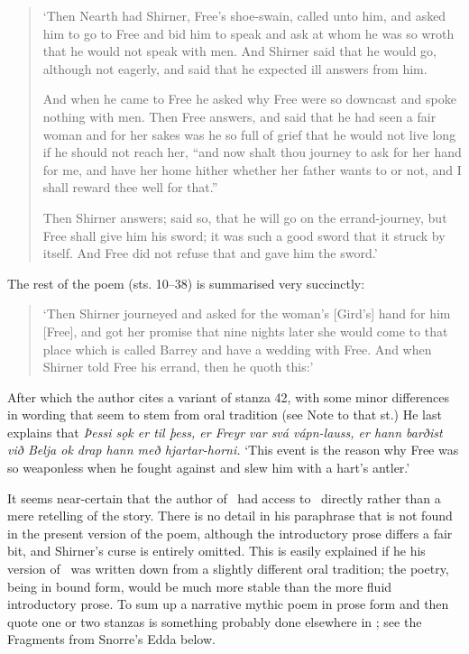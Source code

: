 \begin{quote}{\small ‘Then Nearth had Shirner, Free’s shoe-swain, called unto him, and asked him to go to Free and bid him to speak and ask at whom he was so wroth that he would not speak with men.  And Shirner said that he would go, although not eagerly, and said that he expected ill answers from him.

And when he came to Free he asked why Free were so downcast and spoke nothing with men.  Then Free answers, and said that he had seen a fair woman and for her sakes was he so full of grief that he would not live long if he should not reach her, “and now shalt thou journey to ask for her hand for me, and have her home hither whether her father wants to or not, and I shall reward thee well for that.”

Then Shirner answers; said so, that he will go on the errand-journey, but Free shall give him his sword; it was such a good sword that it struck by itself.  And Free did not refuse that and gave him the sword.’}\end{quote}

The rest of the poem (sts. 10–38) is summarised very succinctly:

\begin{quote}{\small ‘Then Shirner journeyed and asked for the woman’s [Gird’s] hand for him [Free], and got her promise that nine nights later she would come to that place which is called Barrey and have a wedding with Free.  And when Shirner told Free his errand, then he quoth this:’}\end{quote}

After which the author cites a variant of stanza 42, with some minor differences in wording that seem to stem from oral tradition (see Note to that st.)  He last explains that \emph{Þessi sǫk er til þess, er Freyr var svá vápn-lauss, er hann barðist við Belja ok drap hann með hjartar-horni.} ‘This event is the reason why Free was so weaponless when he fought against  and slew him with a hart’s antler.’

It seems near-certain that the author of \Gylfaginning\ had access to \Skirnismal\ directly rather than a mere retelling of the story.  There is no detail in his paraphrase that is not found in the present version of the poem, although the introductory prose differs a fair bit, and Shirner’s curse is entirely omitted.  This is easily explained if he his version of \Skirnismal\ was written down from a slightly different oral tradition; the poetry, being in bound form, would be much more stable than the more fluid introductory prose.  To sum up a narrative mythic poem in prose form and then quote one or two stanzas is something probably done elsewhere in \Gylfaginning; see the Fragments from Snorre’s Edda below.


